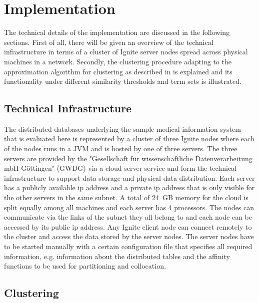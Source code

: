 
\section{Implementation}
\label{sec:impl}

The technical details of the implementation are discussed in the following sections. First of all, there will be given an overview of the technical 
infrastructure in terms of a cluster of Ignite server nodes spread across physical machines in a network. Secondly, the clustering procedure adapting to the 
approximation algorithm for clustering as described in \citet{Gonzales1985} is explained and its functionality under different similarity thresholds and term
sets is illustrated.  



\subsection{Technical Infrastructure}

The distributed  databases underlying the sample medical information system that is evaluated here is represented by a cluster of three
Ignite nodes where each of the nodes runs in a JVM and is hosted by one of three servers. The three servers are provided by the "Gesellschaft für 
wissenschaftliche Datenverarbeitung mbH Göttingen" (GWDG) via a cloud server service and form the technical infrastructure to support data storage and physical
data distribution. Each server has a publicly available ip address and a private ip address that is only visible for the other servers in the same subnet. 
A total of 24~GB memory for the cloud is split equally among all machines and each server has 4 processors. The nodes can communicate via the links of the
subnet they all belong to and each node can be accessed by its public ip address. Any Ignite client node can connect remotely to the cluster and access the 
data stored by the server nodes. The server nodes have to be started manually with a certain configuration file that specifies all required information, e.g.
information about the distributed tables and the affinity functions to be used for partitioning and collocation.

\subsection{Clustering}
\label{sec:impl_clust}

